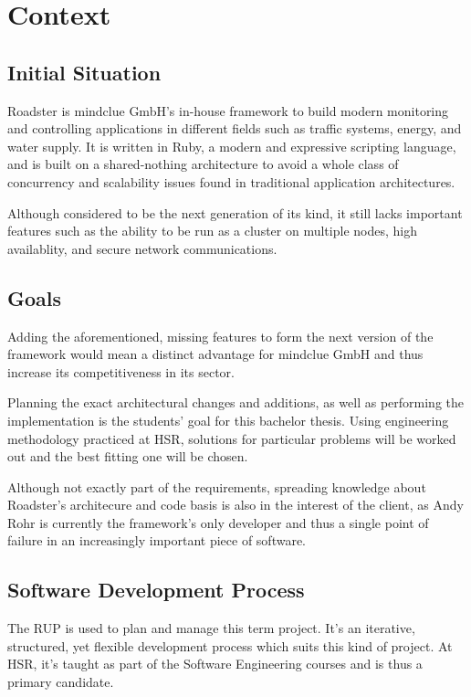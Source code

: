 \chapter{Context}
\section{Initial Situation}
Roadster is mindclue GmbH's in-house framework to build modern monitoring and
controlling applications in different fields such as traffic systems, energy,
and water supply. It is written in Ruby, a modern and expressive scripting
language, and is built on a shared-nothing architecture to avoid a whole class
of concurrency and scalability issues found in traditional application
architectures.

Although considered to be the next generation of its kind, it still lacks
important features such as the ability to be run as a cluster on multiple
nodes, high availablity, and secure network communications.

\section{Goals}
Adding the aforementioned, missing features to form the next version of the
framework would mean a distinct advantage for mindclue GmbH and thus increase
its competitiveness in its sector.

Planning the exact architectural changes and additions, as well as performing
the implementation is the students' goal for this bachelor thesis. Using
engineering methodology practiced at HSR, solutions for particular problems
will be worked out and the best fitting one will be chosen.

Although not exactly part of the requirements, spreading knowledge about Roadster's
architecure and code basis is also in the interest of the client, as Andy Rohr
is currently the framework's only developer and thus a single point of failure
in an increasingly important piece of software.

\section{Software Development Process}
The \gls{RUP} is used to plan and manage this term project. It’s an iterative,
structured, yet flexible development process which suits this kind of project.
At HSR, it’s taught as part of the Software Engineering courses and is thus a
primary candidate.

